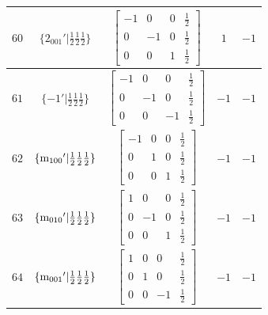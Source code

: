 \documentclass[fleqn,8pt]{jsarticle}
\begin{document}
\begin{longtable}{ccccc}
$ 60 $ & $ \{2{}_{001}{}'|\frac{1}{2} \frac{1}{2} \frac{1}{2}\} $ & $ \begin{bmatrix} -1 & 0 & 0 & \frac{1}{2} \\ 0 & -1 & 0 & \frac{1}{2} \\ 0 & 0 & 1 & \frac{1}{2} \end{bmatrix} $ & $ 1 $ & $ -1 $ \\ \hline
$ 61 $ & $ \{-1{}'|\frac{1}{2} \frac{1}{2} \frac{1}{2}\} $ & $ \begin{bmatrix} -1 & 0 & 0 & \frac{1}{2} \\ 0 & -1 & 0 & \frac{1}{2} \\ 0 & 0 & -1 & \frac{1}{2} \end{bmatrix} $ & $ -1 $ & $ -1 $ \\ \hline
$ 62 $ & $ \{{\rm m}_{100}{}'|\frac{1}{2} \frac{1}{2} \frac{1}{2}\} $ & $ \begin{bmatrix} -1 & 0 & 0 & \frac{1}{2} \\ 0 & 1 & 0 & \frac{1}{2} \\ 0 & 0 & 1 & \frac{1}{2} \end{bmatrix} $ & $ -1 $ & $ -1 $ \\ \hline
$ 63 $ & $ \{{\rm m}_{010}{}'|\frac{1}{2} \frac{1}{2} \frac{1}{2}\} $ & $ \begin{bmatrix} 1 & 0 & 0 & \frac{1}{2} \\ 0 & -1 & 0 & \frac{1}{2} \\ 0 & 0 & 1 & \frac{1}{2} \end{bmatrix} $ & $ -1 $ & $ -1 $ \\ \hline
$ 64 $ & $ \{{\rm m}_{001}{}'|\frac{1}{2} \frac{1}{2} \frac{1}{2}\} $ & $ \begin{bmatrix} 1 & 0 & 0 & \frac{1}{2} \\ 0 & 1 & 0 & \frac{1}{2} \\ 0 & 0 & -1 & \frac{1}{2} \end{bmatrix} $ & $ -1 $ & $ -1 $ \\
\end{longtable}
\end{document}
